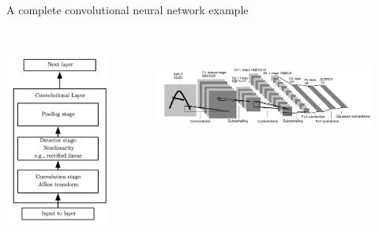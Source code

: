\documentclass{beamer}
\begin{document}
\begin{CJK*}{UTF8}{gbsn}
\begin{frame}{A complete convolutional neural network example}
\begin{columns}
\includegraphics[width=\textwidth]{figures/CNN1}
\begin{figure}
\begin{center} 
\includegraphics[width=\linewidth]{figures/CNN2}  

\end{center}
\end{figure}
\end{columns}
\end{frame}
\end{CJK*}
\end{document}
